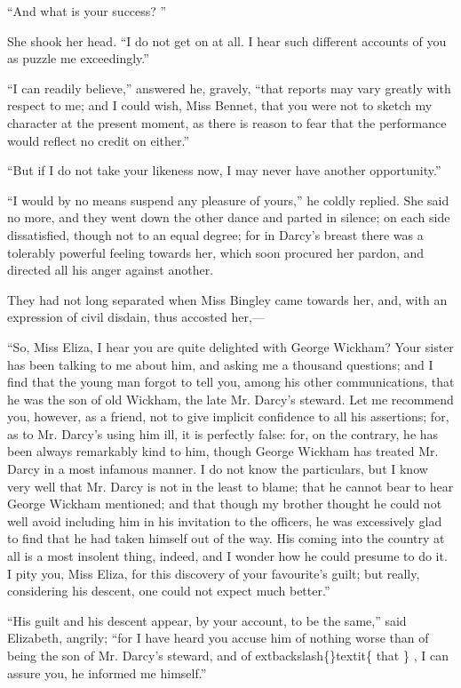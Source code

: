 \documentclass[10pt]{book}
\begin{document}
   “And what is your success?
   ”
  

   She shook her head. “I do not get on at all. I hear such different
accounts of you as puzzle me exceedingly.”
  

   “I can readily believe,” answered he, gravely, “that reports may vary
greatly with respect to me; and I could wish, Miss Bennet, that you were
not to sketch my character at the present moment, as there is reason to
fear that the performance would reflect no credit on either.”
  

   “But if I do not take your likeness now, I may never have another
opportunity.”
  

   “I would by no means suspend any pleasure of yours,” he coldly replied.
She said no more, and they went down the other dance and parted in
silence; on each side dissatisfied, though not to an equal degree; for
in Darcy’s breast there was a tolerably powerful feeling towards her,
which soon procured her pardon, and directed all his anger against
another.
  

   They had not long separated when Miss Bingley came towards her, and,
with an expression of civil disdain, thus accosted her,—
  

   “So, Miss Eliza, I hear you are quite delighted with George Wickham?
Your sister has been talking to me about him, and asking me a thousand
questions; and I find that the young man forgot to tell you, among his
other communications, that he was the son of old Wickham, the late Mr.
Darcy’s steward. Let me recommend you, however, as a friend, not to give
implicit confidence to all his assertions; for, as to Mr. Darcy’s using
him ill, it is perfectly false: for, on the contrary, he has been always
remarkably kind to him, though George Wickham has treated Mr. Darcy in a
most infamous manner. I do not know the particulars, but I know very
well that Mr. Darcy is not in the least to
   blame; that he cannot bear
to hear George Wickham mentioned; and that though my brother thought he
could not well avoid including him in his invitation to the officers, he
was excessively glad to find that he had taken himself out of the way.
His coming into the country at all is a most insolent thing, indeed, and
I wonder how he could presume to do it. I pity you, Miss Eliza, for this
discovery of your favourite’s guilt; but really, considering his
descent, one could not expect much better.”
  

   “His guilt and his descent appear, by your account, to be the same,”
said Elizabeth, angrily; “for I have heard you accuse him of nothing
worse than of being the son of Mr. Darcy’s steward, and of
   	extbackslash\{\}textit\{
    that
   \}
   , I can
assure you, he informed me himself.”
  
\end{document}
